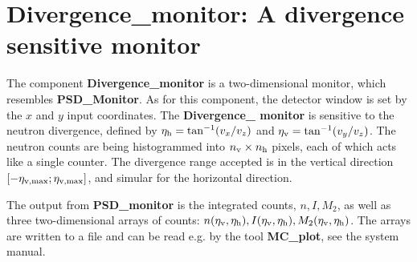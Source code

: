 
\section{Divergence\_monitor: A divergence sensitive monitor}


The component {\bf Divergence\_monitor} is a two-dimensional monitor,
which resembles {\bf PSD\_Monitor}. As for this component,
the detector window is set
by the $x$ and $y$ input coordinates.
The {\bf Divergence\_ monitor} is sensitive to the neutron divergence,
defined by
$\eta_{\rm h} = \tan^{-1}(v_x/v_z)$ and $\eta_{\rm v} = \tan^{-1}(v_y/v_z)$.
The neutron counts are being histogrammed
into $n_{\rm v} \times n_{\rm h}$ pixels, each of which acts like a single
counter. The divergence range accepted is in the vertical direction
$[-\eta_{\rm v,max}; \eta_{\rm v,max}]$, and simular for the horizontal
direction.

The output from {\bf PSD\_monitor} is the integrated counts, $n, I, M_2$,
as well as
three two-dimensional arrays of counts: $n(\eta_{\rm v},\eta_{\rm h}),
I(\eta_{\rm v},\eta_{\rm h}), M_2(\eta_{\rm v},\eta_{\rm h})$.
The arrays are written to a file and can be read e.g. by the tool
{\bf MC\_plot}, see the system manual.

